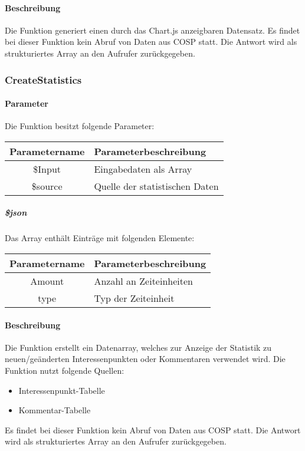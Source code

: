 \paragraph{Beschreibung} Die Funktion generiert einen durch das Chart.js anzeigbaren Datensatz. Es findet bei dieser Funktion kein Abruf von Daten aus {\glqq COSP\grqq} statt. Die Antwort wird als strukturiertes Array an den Aufrufer zurückgegeben.
\subsubsection{CreateStatistics}
\paragraph{Parameter} Die Funktion besitzt folgende Parameter:
\begin{table}[H]
	\begin{tabular}{|c|p{11cm}|}
		\hline
		\textbf{Parametername} & \textbf{Parameterbeschreibung} \\ \hline
		\$Input  & Eingabedaten als Array \\ \hline
		\$source & Quelle der statistischen Daten \\ \hline
	\end{tabular}
\end{table}
\subparagraph{\$json}Das Array enthält Einträge mit folgenden Elemente:
\begin{table}[H]
	\begin{tabular}{|c|p{11cm}|}
		\hline
		\textbf{Parametername} & \textbf{Parameterbeschreibung} \\ \hline
		Amount & Anzahl an Zeiteinheiten \\ \hline
		type   & Typ der Zeiteinheit \\ \hline
	\end{tabular}
\end{table}
\paragraph{Beschreibung} Die Funktion erstellt ein Datenarray, welches zur Anzeige der Statistik zu neuen/geänderten Interessenpunkten oder Kommentaren verwendet wird. Die Funktion nutzt folgende Quellen:
\begin{itemize}
	\item Interessenpunkt-Tabelle
	\item Kommentar-Tabelle
\end{itemize}
Es findet bei dieser Funktion kein Abruf von Daten aus {\glqq COSP\grqq} statt. Die Antwort wird als strukturiertes Array an den Aufrufer zurückgegeben.
